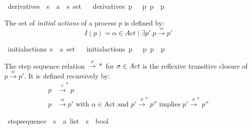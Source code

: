 \begin{isabellebody}
\begin{isamarkuptext}
\end{isamarkuptext}\isamarkuptrue%
\isamarkupfalse%
\ derivatives\ {\isacharcolon}{\kern0pt}{\isacharcolon}{\kern0pt}\ {\isacartoucheopen}{\isacharprime}{\kern0pt}s\ {\isasymRightarrow}\ {\isacharprime}{\kern0pt}a\ {\isasymRightarrow}\ {\isacharprime}{\kern0pt}s\ set{\isacartoucheclose}\isanewline
\ \ \isanewline
{\isacartoucheopen}derivatives\ p\ {\isasymalpha}\ {\isasymequiv}\ {\isacharbraceleft}{\kern0pt}p{\isacharprime}{\kern0pt}{\isachardot}{\kern0pt}\ p\ {\isasymmapsto}{\isasymalpha}\ p{\isacharprime}{\kern0pt}{\isacharbraceright}{\kern0pt}{\isacartoucheclose}%
\begin{isamarkuptext}%
The set of \textit{initial actions} of a process $p$ is defined by: 
$$I(p)={\alpha \in Act \mid \exists p'. p \xrightarrow{\alpha} p'}$$%
\end{isamarkuptext}\isamarkuptrue%
\isamarkupfalse%
\ initial{\isacharunderscore}{\kern0pt}actions{\isacharcolon}{\kern0pt}{\isacharcolon}{\kern0pt}\ {\isacartoucheopen}{\isacharprime}{\kern0pt}s\ {\isasymRightarrow}\ {\isacharprime}{\kern0pt}a\ set{\isacartoucheclose}\isanewline
\ \ \isanewline
{\isacartoucheopen}initial{\isacharunderscore}{\kern0pt}actions\ p\ {\isasymequiv}\ {\isacharbraceleft}{\kern0pt}{\isasymalpha}{\isacharbar}{\kern0pt}{\isasymalpha}{\isachardot}{\kern0pt}\ {\isacharparenleft}{\kern0pt}{\isasymexists}p{\isacharprime}{\kern0pt}{\isachardot}{\kern0pt}\ p\ {\isasymmapsto}{\isasymalpha}\ p{\isacharprime}{\kern0pt}{\isacharparenright}{\kern0pt}{\isacharbraceright}{\kern0pt}{\isacartoucheclose}%
\begin{isamarkuptext}%
The step sequence relation $\xrightarrow{\sigma}*$ for $\sigma \in \mathit{Act}$ is the reflexive transitive closure of $p \xrightarrow{\alpha} p'$.
It is defined recursively by:
\begin{align*}
  p &\xrightarrow{\varepsilon}^* p \\
  p &\xrightarrow{\alpha} p' \text{ with } \alpha \in \text{Act} \text{ and } p' \xrightarrow{\sigma}^* p'' \text{ implies } p' \xrightarrow{\sigma}^* p''
\end{align*}%
\end{isamarkuptext}\isamarkuptrue%
\isamarkupfalse%
\ step{\isacharunderscore}{\kern0pt}sequence\ {\isacharcolon}{\kern0pt}{\isacharcolon}{\kern0pt}\ {\isacartoucheopen}{\isacharprime}{\kern0pt}s\ {\isasymRightarrow}\ {\isacharprime}{\kern0pt}a\ list\ {\isasymRightarrow}\ {\isacharprime}{\kern0pt}s\ {\isasymRightarrow}\ bool{\isacartoucheclose}\ {\isacharparenleft}{\kern0pt}{\isacartoucheopen}{\isacharunderscore}{\kern0pt}\ {\isasymmapsto}{\isachardollar}{\kern0pt}\ {\isacharunderscore}{\kern0pt}\ {\isacharunderscore}{\kern0pt}{\isacartoucheclose}{\isacharbrackleft}{\kern0pt}{}{}{\isacharcomma}{\kern0pt}{}{}{\isacharcomma}{\kern0pt}{}{}{\isacharbrackright}{\kern0pt}\ {}{}{\isacharparenright}{\kern0pt}\ \isanewline

\end{isabellebody}
